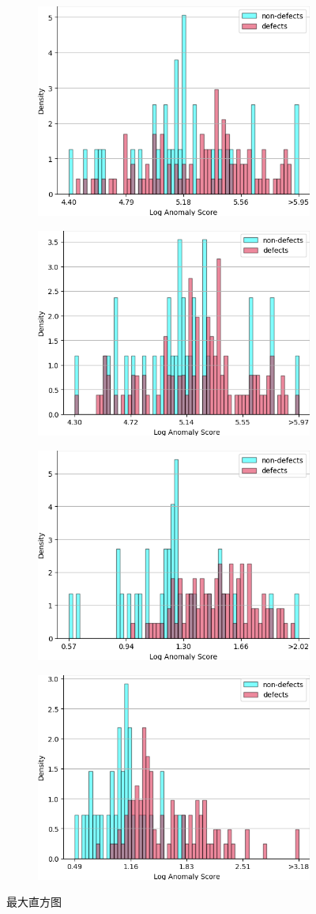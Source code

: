 \begin{figure}[htbp]
\centering
\begin{subfigure}
    \centering
    \includegraphics[width=.4\linewidth]{figures/4/hist/ori_experiment/plastics_max.png}  
    \end{subfigure}
    \begin{subfigure}
    \centering
    \includegraphics[width=.4\linewidth]{figures/4/hist/hog_experiment/plastics_max.png} 
    \end{subfigure}
    \begin{subfigure}
    \centering
    \includegraphics[width=.4\linewidth]{figures/4/hist/mix_experiment/plastics_max.png} 
    \end{subfigure}
    \begin{subfigure}
    \centering
    \includegraphics[width=.4\linewidth]{figures/4/hist/mixhog_experiment/plastics_max.png} 
    \end{subfigure}
\caption{最大直方图}
\label{fig:hist_max}
\end{figure}

